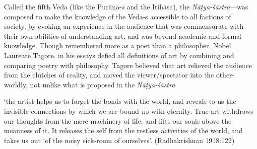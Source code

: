 Called the fifth Veda (like the Purāṇa-\textsl{s} and the Itihāsa), the \textsl{Nāṭya-śāstra}---was composed to make the knowledge of the \hbox{Veda-s} accessible to all factions of society, by evoking an experience in the audience that was commensurate with their own abilities of understanding art, and was beyond academic and formal knowledge. Though remembered more as a poet than a philosopher, Nobel Laureate Tagore, in his essays defied all definitions of art by combining and comparing poetry with philosophy. Tagore believed that art relieved the audience from the clutches of reality, and moved the viewer/spectator into the other-worldly, not unlike what is proposed in the \textsl{Nāṭya-śāstra}. 

\begin{myquote}
‘the artist helps us to forget the bonds with the world, and reveals to us the invisible connections by which we are bound up with eternity. True art withdraws our thoughts from the mere machinery of life, and lifts our souls above the meanness of it. It releases the self from the restless activities of the world, and takes us out ‘of the noisy sick-room of ourselves’.
\hfill (Radhakrishnan 1918:122)
\end{myquote}

